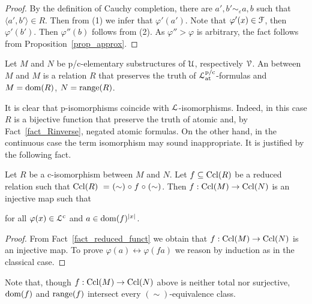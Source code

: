 \documentclass{amsproc}
\renewcommand*{\emph}[1]{%
   \smash{\tikz[baseline]\node[rectangle, fill=teal!25, rounded corners, inner xsep=0.5ex, inner ysep=0.2ex, anchor=base, minimum height = 2.7ex]{\strut #1};}}
\begin{document}
{\begin{proof}


  By the definition of Cauchy completion, there are $a',b'\sim_\varepsilon a,b$ such that $\langle a',b'\rangle\in R$.
  Then from (1) we infer that $\varphi'(a')$.
  Note that $\varphi'(x)\in{\EuScript F}$, then $\varphi'(b')$. 
  Then $\varphi''(b)$ follows from (2).
  As $\varphi''>\varphi$ is arbitrary, the fact follows from Proposition~\ref{prop_approx}.
\end{proof}

\begin{definition}\label{def_ciso}
  Let $M$ and $N$ be p/c-elementary substructures of ${\EuScript U}$, respectively ${\EuScript V}$.
  An \emph{p/c-isomorphism\/} between $M$ and $M$ is a relation $R$ that preserves the truth of ${\EuScript L}^{\rm p/c}_{\rm at}$-formulas and $M={\rm dom}(R)$,  $N={\rm range}(R)$.
\end{definition}

 It is clear that p-isomorphisms coincide with ${\EuScript L}$-isomorphisms. 
 Indeed, in this case $R$ is a bijective function that preserve the truth of atomic and, by Fact~\ref{fact_Rinverse}, negated atomic formulas.
 On the other hand, in the continuous case the term isomorphism may sound inappropriate.
 It is justified by the following fact.

\begin{fact}\label{fact_c_iso}
  Let $R$ be a c-isomorphism between $M$ and $N$.
  Let $f\subseteq{\rm Ccl}(R)$ be a reduced relation such that ${\rm Ccl}(R)\ =\ \mathrel{(\sim)}\circ \mathrel{f}\circ\mathrel{(\sim)}$.
  Then $f:{\rm Ccl}(M)\rightarrow{\rm Ccl}(N)$ is an injective map such that 
  
  \hfill for all $\varphi(x)\in{\EuScript L}^{\rm c}$ and $a\in{\rm dom}(f)^{|x|}$.
\end{fact}

\begin{proof}
  From Fact~\ref{fact_reduced_funct} we obtain that $f:{\rm Ccl}(M)\rightarrow{\rm Ccl}(N)$ is an injective map.
  To prove $\varphi(a)\leftrightarrow\varphi(fa)$ we reason by induction as in the classical case.
\end{proof}

Note that, though $f:{\rm Ccl}(M)\rightarrow{\rm Ccl}(N)$ above is neither total nor surjective, ${\rm dom}(f)$ and ${\rm range}(f)$ intersect every $(\sim)$-equivalence class.

}
\end{document}
